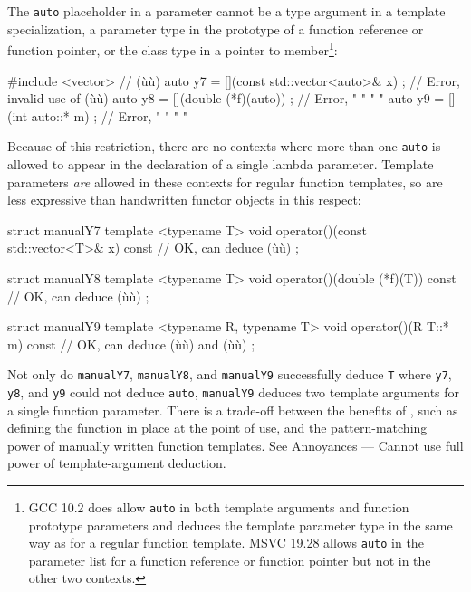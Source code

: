 {The \lstinline!auto! placeholder in a  parameter
cannot be a type argument in a template specialization, a parameter type
in the prototype of a function reference or function pointer, or the
class type in a pointer to member{\cprotect\footnote{GCC 10.2 does allow
\lstinline!auto! in both template arguments and function prototype
parameters and deduces the template parameter type in the same way as
for a regular function template. MSVC 19.28 allows \lstinline!auto! in
the parameter list for a function reference or function pointer but
  not in the other two contexts.}}:

\begin{emcppslisting}[emcppsbatch=e2,emcppsstandards={c++14}]
#include <vector>  // (ù{}ù)
auto y7 = [](const std::vector<auto>& x) { };  // Error, invalid use of (ù{}ù)
auto y8 = [](double (*f)(auto)) { };           // Error,    "     "   "    "
auto y9 = [](int auto::* m) { };               // Error,    "     "   "    "
\end{emcppslisting}
    

\noindent Because of this restriction, there are no contexts where more than one
\lstinline!auto! is allowed to appear in the declaration of a single lambda
parameter. Template parameters \emph{are} allowed in these contexts for
regular function templates, so  are less
expressive than handwritten functor objects in this respect:

\begin{emcppslisting}[emcppsbatch=e2]
struct manualY7
{
    template <typename T>
    void operator()(const std::vector<T>& x) const { }  // OK, can deduce (ù{}ù)
};

struct manualY8
{
    template <typename T>
    void operator()(double (*f)(T)) const { }  // OK, can deduce (ù{}ù)
};

struct manualY9
{
    template <typename R, typename T>
    void operator()(R T::* m) const { }  // OK, can deduce (ù{}ù) and (ù{}ù)
};
\end{emcppslisting}
    

\noindent Not only do \lstinline!manualY7!, \lstinline!manualY8!, and \lstinline!manualY9!
successfully deduce \lstinline!T! where \lstinline!y7!, \lstinline!y8!, and
\lstinline!y9! could not deduce \lstinline!auto!, \lstinline!manualY9! deduces
two template arguments for a single function parameter. There is a
trade-off between the benefits of , such as
defining the function in place at the point of use, and the
pattern-matching power of manually written function templates. See
{Annoyances --- Cannot use full power of template-argument deduction}.

}
